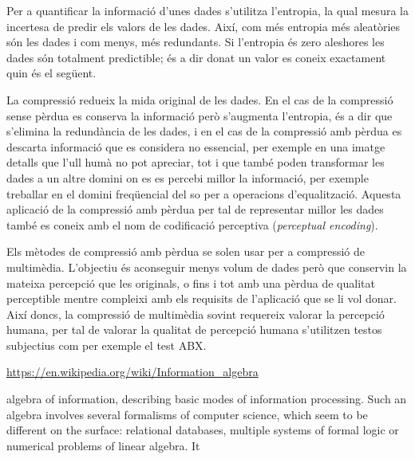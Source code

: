 Per a quantificar la informació d'unes dades s'utilitza l'entropia, la
qual mesura la incertesa de predir els valors de les dades. Així, com
més entropia més aleatòries són les dades i com menys, més
redundants. Si l'entropia és zero aleshores les dades són totalment
predictible; és a dir donat un valor es coneix exactament quin és el
següent.




La compressió redueix la mida original de les dades. En el cas de la
compressió sense pèrdua es conserva la informació però s'augmenta
l'entropia, és a dir que s'elimina la redundància de les dades, i en
el cas de la compressió amb pèrdua es descarta informació que es
considera no essencial, per exemple en una imatge detalls que l'ull
humà no pot apreciar, tot i que també poden transformar les dades a un
altre domini on es es percebi millor la informació, per exemple
treballar en el domini freqüencial del so per a operacions
d'equalització. Aquesta aplicació de la compressió amb pèrdua per tal
de representar millor les dades també es coneix amb el nom de
codificació perceptiva (\emph{perceptual encoding}).



Els mètodes de compressió amb pèrdua se solen usar per a compressió de
multimèdia. L'objectiu és aconseguir menys volum de dades però que
conservin la mateixa percepció que les originals, o fins i tot amb una
pèrdua de qualitat perceptible mentre compleixi amb els requisits de
l'aplicació que se li vol donar. Així doncs, la compressió de
multimèdia sovint requereix valorar la percepció humana, per tal de
valorar la qualitat de percepció humana s'utilitzen testos
subjectius com per exemple el test
ABX.  %





\url{https://en.wikipedia.org/wiki/Information_algebra}

algebra of information, describing basic modes of information processing. Such an algebra involves several formalisms of computer science, which seem to be different on the surface: relational databases, multiple systems of formal logic or numerical problems of linear algebra. It 




